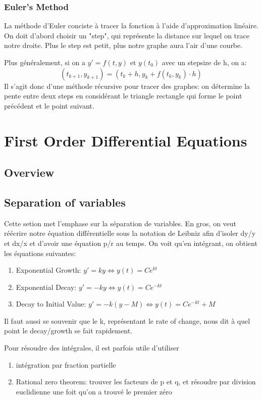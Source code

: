 \documentclass{article}
\begin{document}
\subsubsection{Euler's Method}

La méthode d'Euler conciste à tracer la fonction à l'aide d'approximation
linéaire. On doit d'abord choisir un "step", qui représente la distance
sur lequel on trace notre droite. Plus le step est petit, plus notre graphe
aura l'air d'une courbe.

Plus généralement, si on a $ y' = f(t,y)$ et $ y(t_0)$ avec un stepsize
de h, on a:
$$ (t_{k+1}, y_{k+1}) = (t_k + h, y_k + f(t_k, y_k) \cdot h) $$
Il s'agit donc d'une méthode récursive pour tracer des graphes:
on détermine la pente entre deux steps en considérant le triangle
rectangle qui forme le point précédent et le point suivant.

\pagebreak
\section{First Order Differential Equations}
\subsection*{Overview}

\subsection{Separation of variables}

Cette setion met l'emphase sur la séparation de variables. En gros, on
veut réécrire notre équation différentielle sous la notation de Leibniz
afin d'isoler dy/y et dx/x et d'avoir une équation p/r au temps. On voit
qu'en intégrant, on obtient les équations suivantes:
\begin{enumerate}
    \item Exponential Growth: $ y' = ky \Longleftrightarrow y(t) = C e^{kt} $
    \item Exponential Decay: $ y' = -ky \Longleftrightarrow y(t) = C e^{-kt} $
    \item Decay to Initial Value: $ y' = -k (y-M) \Longleftrightarrow
	y(t) = C e^{-kt} + M $
\end{enumerate}

Il faut aussi se souvenir que le k, représentant le rate of change, nous
dit à quel point le decay/growth se fait rapidement.

\begin{remark}
    Pour résoudre des intégrales, il est parfois utile d'utiliser
    \begin{enumerate}
        \item intégration par fraction partielle
	\item Rational zero theorem: trouver les facteurs de p et q, et
	    résoudre par division euclidienne une foit qu'on a trouvé le
	    premier zéro
    \end{enumerate}
\end{remark}
\end{document}
